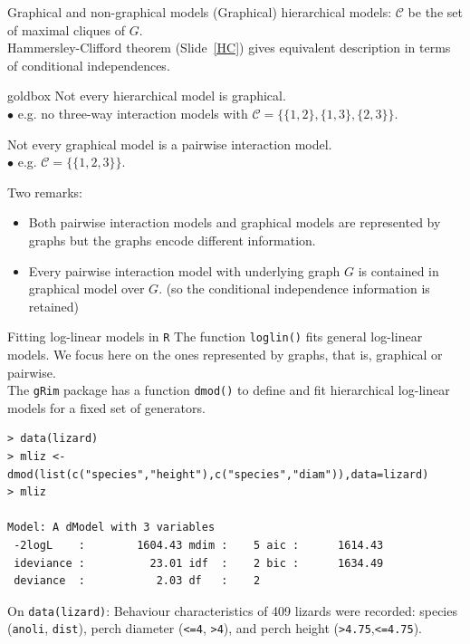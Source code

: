 \documentclass[dvipsnames,aspectratio=169]{beamer} %
\newcommand{\cC}{\mathcal{C}}
\begin{document}
\begin{frame}{Graphical and non-graphical models}
	(Graphical) hierarchical models: $\cC$ be the set of maximal cliques of $G$.\\[.3cm]
	Hammersley-Clifford theorem (Slide~\ref{HC}) gives equivalent description in terms of conditional independences.\\[.3cm]
	
		\begin{beamercolorbox}[wd=\paperwidth,sep=3pt]{goldbox}
Not every hierarchical model is graphical.\\
\quad$\bullet$ e.g. no three-way interaction models with $\cC=\{\{1,2\},\{1,3\},\{2,3\}\}$.		
\medskip
	
	Not every graphical model is a pairwise interaction model. \\
\quad$\bullet$ e.g. $\cC=\{\{1,2,3\}\}$.\\[.3cm]
	\end{beamercolorbox}
	\medskip
	
Two remarks:
\begin{itemize}
\item Both pairwise interaction models and graphical models are represented by graphs but the graphs encode different information. 
	\item Every pairwise interaction model with underlying graph $G$ is contained in graphical model over $G$. (so the conditional independence information is retained)
\end{itemize}
\end{frame}

\begin{frame}[fragile]{Fitting log-linear models in \texttt{R}}
The function \texttt{loglin()} fits general log-linear models. We focus here on the ones represented by graphs, that is, graphical or pairwise. \\[.3cm]

The \texttt{gRim} package has a function \texttt{dmod()} to define and fit hierarchical log-linear models for a fixed set of generators. 	
\begin{lstlisting}
> data(lizard)
> mliz <- dmod(list(c("species","height"),c("species","diam")),data=lizard) 	
> mliz

Model: A dModel with 3 variables
 -2logL    :        1604.43 mdim :    5 aic :      1614.43 
 ideviance :          23.01 idf  :    2 bic :      1634.49 
 deviance  :           2.03 df   :    2 
\end{lstlisting}
{\small On \texttt{data(lizard)}: Behaviour characteristics of 409 lizards were recorded: species (\texttt{anoli}, \texttt{dist}), perch diameter (\texttt{<=4}, \texttt{>4}), and perch height (\texttt{>4.75},\texttt{<=4.75}).}
\end{frame}
\end{document}

